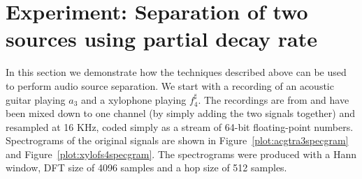 \chapter{Experiment: Separation of two sources using partial decay rate}

In this section we demonstrate how the techniques described above can be used to
perform audio source separation. We start with a recording of an acoustic guitar
playing $a_{3}$ and a xylophone playing $f_{4}^{\sharp}$. The recordings are
from \cite{opolko1987mcgill} and have been mixed down to one channel (by simply
adding the two signals together) and resampled at 16 KHz, coded simply as a
stream of 64-bit floating-point numbers. Spectrograms of the original signals are
shown in Figure~\ref{plot:acgtra3specgram} and
Figure~\ref{plot:xylofs4specgram}. The spectrograms were produced with a
Hann window, DFT size of 4096 samples and a hop size of 512 samples.


